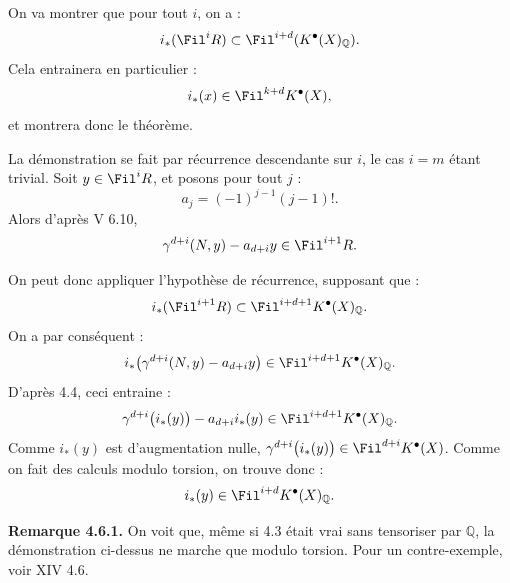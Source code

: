 
On va
montrer que pour tout \(i\), on a :
\[
  i_*(\Fil^iR)\subset \Fil^{i+d}(K^{\bullet}(X)_{\mathbb Q}).
\]
Cela entrainera en particulier :
\[
  i_*(x)\in\Fil^{k+d}K^{\bullet}(X),
\]
et montrera donc le théorème.

La démonstration se fait par récurrence descendante sur \(i\), le cas \(i=m\) étant trivial. Soit \(y\in\Fil^iR\), et posons pour tout \(j\) :
\[
  a_j=(-1)^{j-1}(j-1)!.
\]
Alors d'après V 6.10,
\[
  \gamma^{d+i}(N,y)-a_{d+i}y\in\Fil^{i+1}R.
\]

On peut donc appliquer l'hypothèse de récurrence, supposant que :
\[
  i_*(\Fil^{i+1}R)\subset \Fil^{i+d+1}K^{\bullet}(X)_{\mathbb Q}.
\]
On a par conséquent :
\[
  i_*\bigl(\gamma^{d+i}(N,y)-a_{d+i}y\bigr)
  \in\Fil^{i+d+1}K^{\bullet}(X)_{\mathbb Q}.
\]
D'après 4.4, ceci entraine :
\[
  \gamma^{d+i}\bigl(i_*(y)\bigr)-a_{d+i}i_*(y)
  \in\Fil^{i+d+1}K^{\bullet}(X)_{\mathbb Q}.
\]
Comme \(i_*(y)\) est d'augmentation nulle, \(\gamma^{d+i}\bigl(i_*(y)\bigr)\in\Fil^{d+i}K^{\bullet}(X)\).
Comme on fait des calculs modulo torsion, on trouve donc :
\[
  i_*(y)\in\Fil^{i+d}K^{\bullet}(X)_{\mathbb Q}.
\]

\textbf{Remarque 4.6.1.} On voit que, même si 4.3 était vrai sans tensoriser par \(\mathbb Q\), la démonstration ci-dessus ne marche que modulo torsion. Pour un contre-exemple, voir XIV 4.6.


